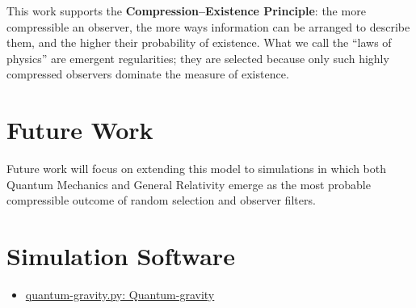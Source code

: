 \documentclass[11pt]{article}
\begin{document}
This work supports the \textbf{Compression–Existence Principle}: the more compressible an observer, the more ways information can be arranged to describe them, and the higher their probability of existence. What we call the “laws of physics” are emergent regularities; they are selected because only such highly compressed observers dominate the measure of existence.

\section*{Future Work}
Future work will focus on extending this model to simulations in which both Quantum Mechanics and General Relativity emerge as the most probable compressible outcome of random selection and observer filters.


\section*{Simulation Software}

\begin{itemize}
\item \href{simulations/quantum-gravity.py}{quantum-gravity.py: Quantum-gravity}
\end{itemize}

\printbibliography
\end{document}
